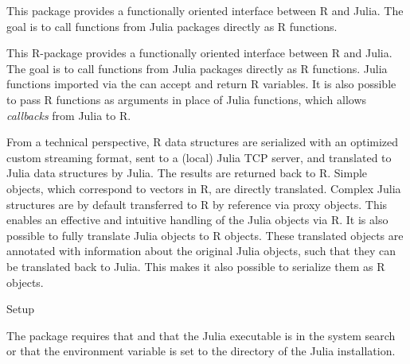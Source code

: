 %
\begin{Description}\relax
This package provides a functionally oriented interface between R and Julia.
The goal is to call functions from Julia packages directly as R functions.
\end{Description}
%
\begin{Details}\relax
This R-package provides a functionally oriented interface between R and Julia.
The goal is to call functions from Julia packages directly as R functions.
Julia functions imported via the  can accept and return R variables.
It is also possible to pass R functions as arguments in place of Julia functions,
which allows \emph{callbacks} from Julia to R.

From a technical perspective, R data structures are serialized with an optimized custom streaming format,
sent to a (local) Julia TCP server, and translated to Julia data structures by Julia.
The results are returned back to R.
Simple objects, which correspond to vectors in R, are directly translated.
Complex Julia structures are by default transferred to R by reference via proxy objects.
This enables an effective and intuitive handling of the Julia objects via R.
It is also possible to fully translate Julia objects to R objects.
These translated objects are annotated with information
about the original Julia objects, such that they can be translated back to Julia.
This makes it also possible to serialize them as R objects.
\end{Details}
%
\begin{Section}{Setup}

The package requires that
and that the Julia executable is in the system search  or that the
 environment variable is set to the  directory of
the Julia installation.
\end{Section}
%
